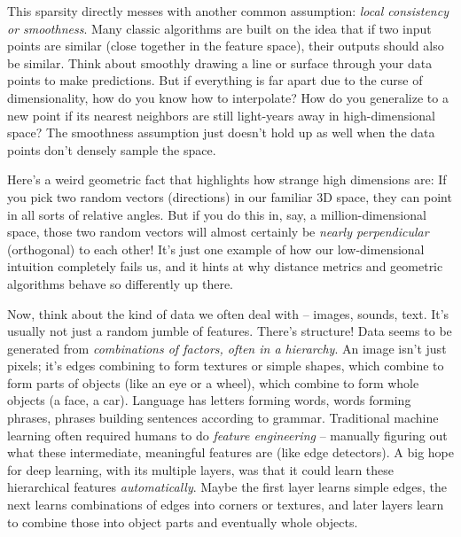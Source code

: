 \documentclass{article}
\begin{document}
This sparsity directly messes with another common assumption: \emph{local consistency or smoothness}. Many classic algorithms are built on the idea that if two input points are similar (close together in the feature space), their outputs should also be similar. Think about smoothly drawing a line or surface through your data points to make predictions. But if everything is far apart due to the curse of dimensionality, how do you know how to interpolate? How do you generalize to a new point if its nearest neighbors are still light-years away in high-dimensional space? The smoothness assumption just doesn't hold up as well when the data points don't densely sample the space.

Here's a weird geometric fact that highlights how strange high dimensions are: If you pick two random vectors (directions) in our familiar 3D space, they can point in all sorts of relative angles. But if you do this in, say, a million-dimensional space, those two random vectors will almost certainly be \emph{nearly perpendicular} (orthogonal) to each other! It's just one example of how our low-dimensional intuition completely fails us, and it hints at why distance metrics and geometric algorithms behave so differently up there.

Now, think about the kind of data we often deal with – images, sounds, text. It's usually not just a random jumble of features. There's structure! Data seems to be generated from \emph{combinations of factors, often in a hierarchy}. An image isn't just pixels; it's edges combining to form textures or simple shapes, which combine to form parts of objects (like an eye or a wheel), which combine to form whole objects (a face, a car). Language has letters forming words, words forming phrases, phrases building sentences according to grammar. Traditional machine learning often required humans to do \emph{feature engineering} – manually figuring out what these intermediate, meaningful features are (like edge detectors). A big hope for deep learning, with its multiple layers, was that it could learn these hierarchical features \emph{automatically}. Maybe the first layer learns simple edges, the next learns combinations of edges into corners or textures, and later layers learn to combine those into object parts and eventually whole objects.
\end{document}
